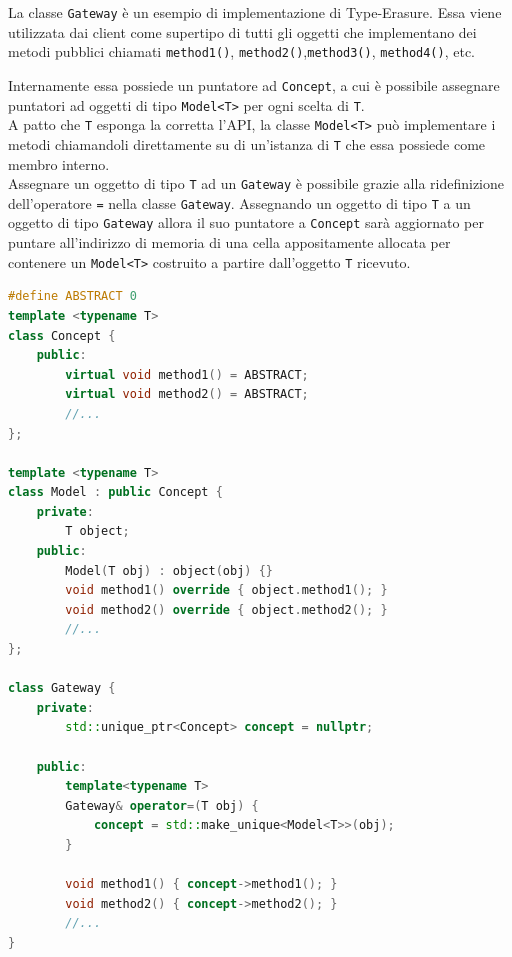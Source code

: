 La classe \texttt{Gateway} è un esempio di implementazione di Type-Erasure. Essa viene utilizzata dai client 
come supertipo di tutti gli oggetti che implementano dei metodi pubblici chiamati \texttt{method1()}, 
\texttt{method2()},\texttt{method3()}, \texttt{method4()}, etc. \\

\newpage

Internamente essa possiede un puntatore ad \texttt{Concept}, a cui è possibile assegnare 
puntatori ad oggetti di tipo \texttt{Model<T>} per ogni scelta di \texttt{T}. \\

A patto che \texttt{T} esponga la corretta l'API, la classe \texttt{Model<T>} può implementare i metodi chiamandoli 
direttamente su di un'istanza di \texttt{T} che essa possiede come membro interno. \\

Assegnare un oggetto di tipo \texttt{T} ad un \texttt{Gateway} è possibile grazie alla ridefinizione dell'operatore \texttt{=}
nella classe \texttt{Gateway}. Assegnando un oggetto di tipo \texttt{T} a un oggetto di tipo \texttt{Gateway} allora 
il suo puntatore a \texttt{Concept} sarà aggiornato per puntare all'indirizzo di memoria di una cella appositamente allocata 
per contenere un \texttt{Model<T>} costruito a partire dall'oggetto \texttt{T} ricevuto. \\

\vspace{0.5cm}
\begin{lstlisting}[language=C++, frame=single]
#define ABSTRACT 0
template <typename T>
class Concept {
    public:
        virtual void method1() = ABSTRACT;
        virtual void method2() = ABSTRACT;
        //...
};

template <typename T>
class Model : public Concept {
    private:
        T object;
    public:
        Model(T obj) : object(obj) {}
        void method1() override { object.method1(); }
        void method2() override { object.method2(); }
        //...
};

class Gateway {
    private:
        std::unique_ptr<Concept> concept = nullptr;

    public:
        template<typename T>
        Gateway& operator=(T obj) {
            concept = std::make_unique<Model<T>>(obj);
        }

        void method1() { concept->method1(); }
        void method2() { concept->method2(); }
        //...
}

\end{lstlisting}
\vspace{0.5cm}

